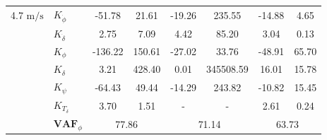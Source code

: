 \begin{table}[]
\begin{tabular}{llcccccc}
    4.7 $\si{\meter\per\second}$ & $K_{\dot{\phi}} $     & -51.78                                     & 21.61                                              & -19.26                                     & 235.55                                             & -14.88                                     & 4.65                                               \\
                                 & $K_{\dot{\delta}}$    & 2.75                                       & 7.09                                               & 4.42                                       & 85.20                                              & 3.04                                       & 0.13                                               \\
                                 & $K_{\phi} $           & -136.22                                    & 150.61                                             & -27.02                                     & 33.76                                              & -48.91                                     & 65.70                                              \\
                                 & $K_\delta $           & 3.21                                       & 428.40                                             & 0.01                                       & 345508.59                                          & 16.01                                      & 15.78                                              \\
                                 & $K_\psi $             & -64.43                                     & 49.44                                              & -14.29                                     & 243.82                                             & -10.82                                     & 15.45                                              \\
                                 & $K_{T_\delta}$        & 3.70                                       & 1.51                                               & -                                          & -                                                  & 2.61                                       & 0.24                                               \\ \cline{2-8} 
                                 & $\mathbf{VAF}_\phi$   & \multicolumn{2}{c}{77.86}                                                                       & \multicolumn{2}{c}{71.14}                                                                       & \multicolumn{2}{c}{63.73}                                                                       \\

\end{tabular}
\end{table}
